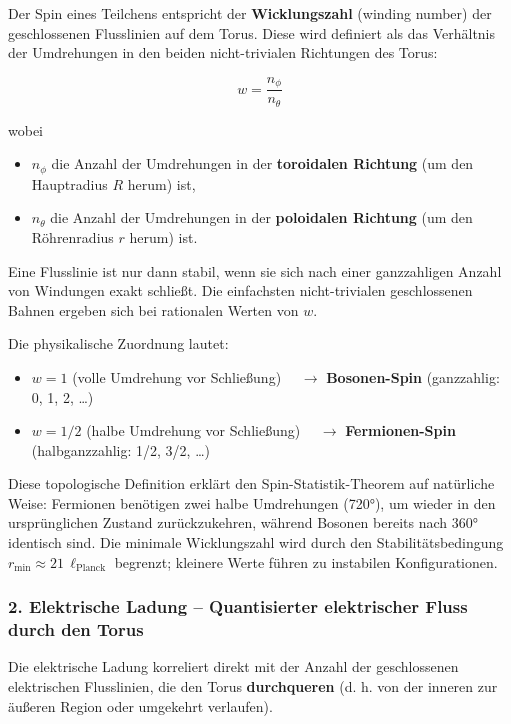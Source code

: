 \documentclass[12pt,a4paper]{article}
\begin{document}
	Der Spin eines Teilchens entspricht der \textbf{Wicklungszahl} (winding number) der geschlossenen Flusslinien auf dem Torus. Diese wird definiert als das Verhältnis der Umdrehungen in den beiden nicht-trivialen Richtungen des Torus:
	
	\begin{equation}
		w = \frac{n_\phi}{n_\theta}
		\label{eq:winding_number}
	\end{equation}
	
	wobei
	\begin{itemize}
		\item $n_\phi$ die Anzahl der Umdrehungen in der \textbf{toroidalen Richtung} (um den Hauptradius $R$ herum) ist,
		\item $n_\theta$ die Anzahl der Umdrehungen in der \textbf{poloidalen Richtung} (um den Röhrenradius $r$ herum) ist.
	\end{itemize}
	
	Eine Flusslinie ist nur dann stabil, wenn sie sich nach einer ganzzahligen Anzahl von Windungen exakt schließt. Die einfachsten nicht-trivialen geschlossenen Bahnen ergeben sich bei rationalen Werten von $w$.
	
	Die physikalische Zuordnung lautet:
	\begin{itemize}
		\item $w = 1$ \quad (volle Umdrehung vor Schließung) $\quad \to$ \textbf{Bosonen-Spin} (ganzzahlig: 0, 1, 2, …)
		\item $w = 1/2$ \quad (halbe Umdrehung vor Schließung) $\quad \to$ \textbf{Fermionen-Spin} (halbganzzahlig: 1/2, 3/2, …)
	\end{itemize}
	
	Diese topologische Definition erklärt den Spin-Statistik-Theorem auf natürliche Weise: Fermionen benötigen zwei halbe Umdrehungen (720°), um wieder in den ursprünglichen Zustand zurückzukehren, während Bosonen bereits nach 360° identisch sind. Die minimale Wicklungszahl wird durch den Stabilitätsbedingung $r_{\min} \approx 21 \, \ell_{\text{Planck}}$ begrenzt; kleinere Werte führen zu instabilen Konfigurationen.
	
	\subsubsection{2. Elektrische Ladung – Quantisierter elektrischer Fluss durch den Torus}
	
	Die elektrische Ladung korreliert direkt mit der Anzahl der geschlossenen elektrischen Flusslinien, die den Torus \textbf{durchqueren} (d. h. von der inneren zur äußeren Region oder umgekehrt verlaufen).
	
\end{document}
